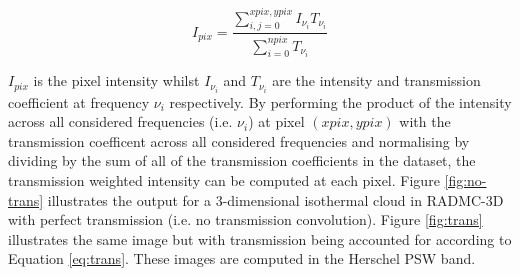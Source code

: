 \documentclass{report}
\begin{document}
\begin{equation}
  I_{pix} = \frac{\sum_{i,j=0}^{xpix,ypix} I_{\nu_i} T_{\nu_i}}{\sum_{i=0}^{npix} T_{\nu_i}}
  \label{eq:trans}
\end{equation}

$I_{pix}$ is the pixel intensity whilst $I_{\nu_i}$ and $T_{\nu_i}$ are the intensity and transmission coefficient at frequency $\nu_i$ respectively.  By performing the product of the intensity across all considered frequencies (i.e. $\nu_i$) at pixel $(xpix,ypix)$ with the transmission coefficent across all considered frequencies and normalising by dividing by the sum of all of the transmission coefficients in the dataset, the transmission weighted intensity can be computed at each pixel. Figure \ref{fig:no-trans} illustrates the output for a 3-dimensional isothermal cloud in RADMC-3D with perfect transmission (i.e. no transmission convolution). Figure \ref{fig:trans} illustrates the same image but with transmission being accounted for according to Equation \ref{eq:trans}. These images are computed in the Herschel PSW band.
\end{document}
